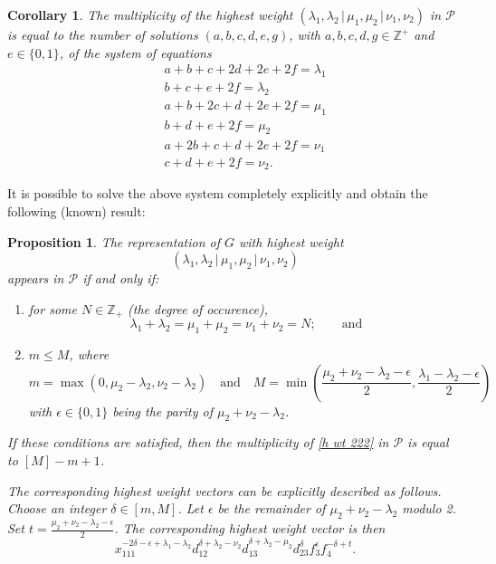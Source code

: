 \documentclass[reqno,11pt]{amsart}
\newtheorem{cor}[equation]{Corollary}
\newtheorem{prop}[equation]{Proposition}
\theoremstyle{remark}
\theoremstyle{definition}
\numberwithin{equation}{section}
\newcommand{\bbar}{\,\big|\,}
\newcommand\la{{\lambda}}
\newcommand{\eq}{\begin{equation}}
\newcommand{\eeq}{\end{equation}}
\newcommand{\bbZ}{\mathbb{Z}}
\newcommand{\Pol}{\mathcal{P}}
\begin{document}
\begin{cor}\label{cor mult 222}
The multiplicity of the highest weight
$(\la_1,\la_2\bbar\mu_1,\mu_2\bbar\nu_1,\nu_2)$
in $\Pol$ is equal to the number of solutions $(a,b,c,d,e,g)$, with $a,b,c,d,g\in\bbZ^+$ and $e\in\{0,1\}$,  of the system of equations 
\begin{eqnarray*}
&&a+b+c+2d+2e+2f=\la_1 \\
&&b+c+e+2f=\la_2 \\
&&a+b+2c+d+2e+2f=\mu_1 \\
&&b+d+e+2f=\mu_2 \\
&&a+2b+c+d+2e+2f=\nu_1 \\
&&c+d+e+2f=\nu_2.
\end{eqnarray*}
\end{cor}
It is possible to solve the above system completely explicitly and obtain the following (known) result:

\begin{prop}
\label{mult 222}
The representation of $G$ with highest weight 
\eq\label{h wt 222}
(\la_1,\la_2\bbar\mu_1,\mu_2\bbar\nu_1,\nu_2)
\eeq
appears in $\Pol$ if and only if:
\begin{enumerate}
\item  for some $N\in\bbZ_+$ (the degree of occurence),
\[
\la_1+\la_2=\mu_1+\mu_2=\nu_1+\nu_2=N;\qquad\text{and}
\]
\item $m\leq M$, where
\[
m=\max(0,\mu_2-\la_2,\nu_2-\la_2)\quad \text{and}\quad M= \min\left(\frac{\mu_2+\nu_2-\la_2-\epsilon}{2},\frac{\la_1-\la_2-\epsilon}{2}\right)
\]
with $\epsilon\in\{0,1\}$ being the parity of 
$\mu_2+\nu_2-\la_2$.
\end{enumerate}
If these conditions are satisfied, then the multiplicity of \eqref{h wt 222} in $\Pol$ is equal to $[M]-m+1$.

The corresponding highest weight vectors can be explicitly described as follows. Choose an integer $\delta\in[m,M]$. Let $\epsilon$ be the remainder of $\mu_2+\nu_2-\la_2$ modulo 2. Set $t=\frac{\mu_2+\nu_2-\la_2-\epsilon}{2}$. The corresponding highest weight vector is then
\[
x_{111}^{-2\delta-\epsilon+\la_1-\la_2} d_{12}^{\delta+\la_2-\nu_2} d_{13}^{\delta+\la_2-\mu_2} d_{23}^\delta f_3^\epsilon f_4^{-\delta+t}.
\]
\end{prop}
\end{document}
